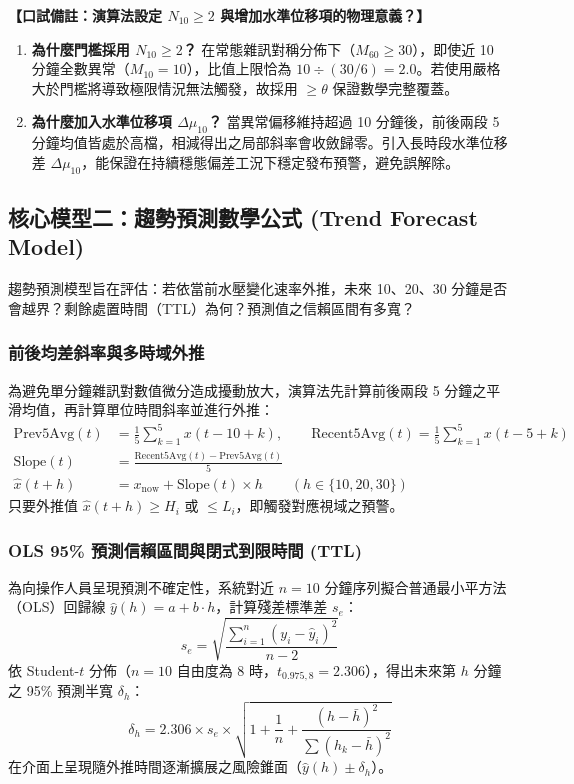 \documentclass[fontset=none, a4paper, 12pt]{ctexart}
\begin{document}
\begin{doublespace}
\noindent\textbf{【口試備註：演算法設定 $N_{10} \ge 2$ 與增加水準位移項的物理意義？】}
\begin{enumerate}
    \item \textbf{為什麼門檻採用 $N_{10} \ge 2$？} 在常態雜訊對稱分佈下（$M_{60} \ge 30$），即使近 10 分鐘全數異常（$M_{10}=10$），比值上限恰為 $10 \div (30/6) = 2.0$。若使用嚴格大於門檻將導致極限情況無法觸發，故採用 $\ge \theta$ 保證數學完整覆蓋。
    \item \textbf{為什麼加入水準位移項 $\Delta\mu_{10}$？} 當異常偏移維持超過 10 分鐘後，前後兩段 5 分鐘均值皆處於高檔，相減得出之局部斜率會收斂歸零。引入長時段水準位移差 $\Delta\mu_{10}$，能保證在持續穩態偏差工況下穩定發布預警，避免誤解除。
\end{enumerate}

\subsection{核心模型二：趨勢預測數學公式 (Trend Forecast Model)}
\label{sec:trend_forecast}
趨勢預測模型旨在評估：若依當前水壓變化速率外推，未來 10、20、30 分鐘是否會越界？剩餘處置時間（TTL）為何？預測值之信賴區間有多寬？

\subsubsection{前後均差斜率與多時域外推}
為避免單分鐘雜訊對數值微分造成擾動放大，演算法先計算前後兩段 5 分鐘之平滑均值，再計算單位時間斜率並進行外推：
\begin{align}
\mathrm{Prev5Avg}(t) &= \frac{1}{5} \sum_{k=1}^5 x(t-10+k), \qquad
\mathrm{Recent5Avg}(t) = \frac{1}{5} \sum_{k=1}^5 x(t-5+k) \nonumber \\
\mathrm{Slope}(t) &= \frac{\mathrm{Recent5Avg}(t) - \mathrm{Prev5Avg}(t)}{5} \nonumber \\
\hat{x}(t+h) &= x_{\mathrm{now}} + \mathrm{Slope}(t) \times h \qquad (h\in\{10,20,30\})
\label{eq:base_slope}
\end{align}
只要外推值 $\hat{x}(t+h) \ge H_i$ 或 $\le L_i$，即觸發對應視域之預警。

\subsubsection{OLS 95\% 預測信賴區間與閉式到限時間 (TTL)}
為向操作人員呈現預測不確定性，系統對近 $n=10$ 分鐘序列擬合普通最小平方法（OLS）回歸線 $\hat{y}(h) = a + b \cdot h$，計算殘差標準差 $s_e$：
\begin{equation}
s_e = \sqrt{\frac{\sum_{i=1}^n (y_i - \hat{y}_i)^2}{n - 2}}
\end{equation}
依 Student-$t$ 分佈（$n=10$ 自由度為 8 時，$t_{0.975,8} = 2.306$），得出未來第 $h$ 分鐘之 95\% 預測半寬 $\delta_h$：
\begin{equation}
\delta_h = 2.306 \times s_e \times \sqrt{1 + \frac{1}{n} + \frac{(h - \bar{h})^2}{\sum (h_k - \bar{h})^2}}
\label{eq:pred_band}
\end{equation}
在介面上呈現隨外推時間逐漸擴展之風險錐面（$\hat{y}(h) \pm \delta_h$）。


\end{doublespace}
\end{document}
